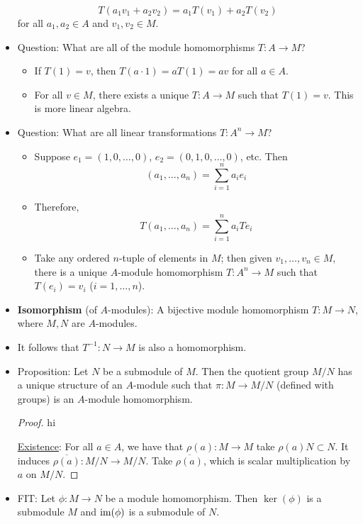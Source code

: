 \documentclass[../notes.tex]{subfiles}
\begin{document}
\begin{itemize}
    \begin{equation*}
        T(a_1v_1+a_2v_2) = a_1T(v_1)+a_2T(v_2)
    \end{equation*}
    for all $a_1,a_2\in A$ and $v_1,v_2\in M$.
    \item Question: What are all of the module homomorphisms $T:A\to M$?
    \begin{itemize}
        \item If $T(1)=v$, then $T(a\cdot 1)=aT(1)=av$ for all $a\in A$.
        \item For all $v\in M$, there exists a unique $T:A\to M$ such that $T(1)=v$. This is more linear algebra.
    \end{itemize}
    \item Question: What are all linear transformations $T:A^n\to M$?
    \begin{itemize}
        \item Suppose $e_1=(1,0,\dots,0)$, $e_2=(0,1,0,\dots,0)$, etc. Then
        \begin{equation*}
            (a_1,\dots,a_n) = \sum_{i=1}^na_ie_i
        \end{equation*}
        \item Therefore,
        \begin{equation*}
            T(a_1,\dots,a_n) = \sum_{i=1}^na_iTe_i
        \end{equation*}
        \item Take any ordered $n$-tuple of elements in $M$; then given $v_1,\dots,v_n\in M$, there is a unique $A$-module homomorphism $T:A^n\to M$ such that $T(e_i)=v_i$ ($i=1,\dots,n$).
    \end{itemize}
    \item \textbf{Isomorphism} (of $A$-modules): A bijective module homomorphism $T:M\to N$, where $M,N$ are $A$-modules.
    \item It follows that $T^{-1}:N\to M$ is also a homomorphism.
    \item Proposition: Let $N$ be a submodule of $M$. Then the quotient group $M/N$ has a unique structure of an $A$-module such that $\pi:M\to M/N$ (defined with groups) is an $A$-module homomorphism.
    \begin{proof}
        {\color{white}hi}\par
        \underline{Existence}: For all $a\in A$, we have that $\rho(a):M\to M$ take $\rho(a)N\subset N$. It induces $\overline{\rho(a)}:M/N\to M/N$. Take $\overline{\rho(a)}$, which is scalar multiplication by $a$ on $M/N$.
    \end{proof}
    \item FIT: Let $\phi:M\to N$ be a module homomorphism. Then $\ker(\phi)$ is a submodule $M$ and $\operatorname{im}(\phi)$ is a submodule of $N$.
    \begin{figure}[H]
        \centering
\end{figure}
\end{itemize}
\end{document}
